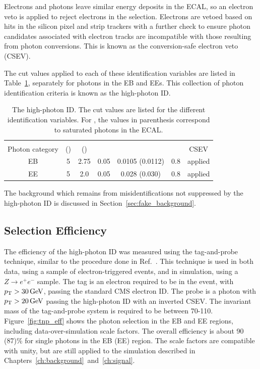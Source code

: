 Electrons and photons leave similar energy deposits in the ECAL, so an electron veto is applied to reject electrons in the selection. Electrons are vetoed based on hits in the silicon pixel and strip trackers with a further check to ensure photon candidates associated with electron tracks are incompatible with those resulting from photon conversions. This is known as the conversion-safe electron veto (CSEV).

The cut values applied to each of these identification variables are listed in Table~\ref{tab:photon_ID}, separately for photons in the EB and EEs. This collection of photon identification criteria is known as the high-\pt photon ID. 


\begin{table}[!htbp]
	\caption{The high-\pt photon ID. The cut values are listed for the different identification variables. For \sieie, the values in parenthesis correspond to saturated photons in the ECAL.}
	\centering
	\vspace{\baselineskip}
	\begin{tabular}{c|cccccc}
		\hline \hline
		\vspace*{-4.5mm} & & & & & \\
		\vspace*{+0.1mm}Photon category & \chiso ({\GeVns}) & \corphoiso ({\GeVns}) & \hoe & \sieie & \rnine & CSEV \\
		\hline
		EB & 5 & 2.75 & 0.05 & 0.0105 (0.0112) & 0.8 & applied \\
		EE & 5 & 2.0  & 0.05 & 0.028 (0.030) & 0.8 & applied \\ 
		\hline \hline
	\end{tabular}
	\label{tab:photon_ID}
\end{table}

The background which remains from misidentifications not suppressed by the high-\pt photon ID is discussed in Section~\ref{sec:fake_background}.


\subsection{Selection Efficiency}

The efficiency of the high-\pt photon ID was measured using the tag-and-probe technique, similar to the procedure done in Ref.~\cite{CMS:2011aa}. This technique is used in both data, using a sample of electron-triggered events, and in simulation, using a $Z \to e^+ e^-$ sample. The tag is an electron required to be in the event, with $p_{\mathrm{T}} > 30\,\text{Ge\hspace{-.08em}V}$, passing the standard CMS electron ID. The probe is a photon with $p_{\mathrm{T}} > 20\,\text{Ge\hspace{-.08em}V}$ passing the high-\pt photon ID with an inverted CSEV. The invariant mass of the tag-and-probe system is required to be between 70-110\GeV. Figure~\ref{fig:tnp_eff} shows the photon selection in the EB and EE regions, including data-over-simulation scale factors. The overall efficiency is about 90 (87)\% for single photons in the EB (EE) region. The scale factors are compatible with unity, but are still applied to the simulation described in Chapters~\ref{ch:background}~and~\ref{ch:signal}.

